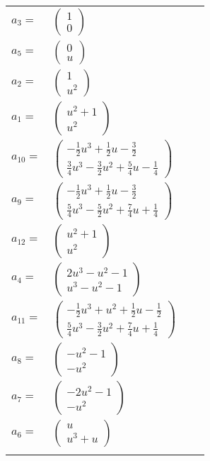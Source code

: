 \documentclass[1p]{elsarticle_modified}
\theoremstyle{definition}
\begin{document}
\begin{tabular}{m{7pt} m{180pt} m{7pt} m{180pt} }
\flushright $a_{3}=$&$\begin{pmatrix}1\\0\end{pmatrix}$ \\
\flushright $a_{5}=$&$\begin{pmatrix}0\\u\end{pmatrix}$ \\
\flushright $a_{2}=$&$\begin{pmatrix}1\\u^2\end{pmatrix}$ \\
\flushright $a_{1}=$&$\begin{pmatrix}u^2+1\\u^2\end{pmatrix}$ \\
\flushright $a_{10}=$&$\begin{pmatrix}-\frac{1}{2} u^3+\frac{1}{2} u-\frac{3}{2}\\\frac{3}{4} u^3-\frac{3}{2} u^2+\frac{5}{4} u-\frac{1}{4}\end{pmatrix}$ \\
\flushright $a_{9}=$&$\begin{pmatrix}-\frac{1}{2} u^3+\frac{1}{2} u-\frac{3}{2}\\\frac{5}{4} u^3-\frac{5}{2} u^2+\frac{7}{4} u+\frac{1}{4}\end{pmatrix}$ \\
\flushright $a_{12}=$&$\begin{pmatrix}u^2+1\\u^2\end{pmatrix}$ \\
\flushright $a_{4}=$&$\begin{pmatrix}2 u^3- u^2-1\\u^3- u^2-1\end{pmatrix}$ \\
\flushright $a_{11}=$&$\begin{pmatrix}-\frac{1}{2} u^3+u^2+\frac{1}{2} u-\frac{1}{2}\\\frac{5}{4} u^3-\frac{3}{2} u^2+\frac{7}{4} u+\frac{1}{4}\end{pmatrix}$ \\
\flushright $a_{8}=$&$\begin{pmatrix}- u^2-1\\- u^2\end{pmatrix}$ \\
\flushright $a_{7}=$&$\begin{pmatrix}-2 u^2-1\\- u^2\end{pmatrix}$ \\
\flushright $a_{6}=$&$\begin{pmatrix}u\\u^3+u\end{pmatrix}$\\&\end{tabular}
\end{document}
